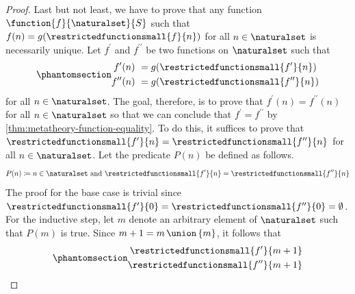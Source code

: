 \begin{proof}
    \vspace{0.3cm}
    \noindent
    Last but not least, we have to prove that any function \( \function{f}{\naturalset}{S} \) such that \( f(n) = g(\restrictedfunctionsmall{f}{n}) \)
    for all \( n \in \naturalset \) is necessarily unique.
    Let \( f^{\prime} \) and \( f^{\prime\prime} \) be two functions on \( \naturalset \) such that
    \begin{equation}
        \phantomsection \label{eq:f-prime-and-f-prime-prime-at-n-equals-g-at-the-function-restricted-to-n}
        \begin{aligned}
            f^{\prime}(n) &\\
            f^{\prime\prime}(n)&
        \end{aligned}
        \begin{aligned}
            &\ = g( \restrictedfunctionsmall{f^{\prime}}{n} )\\
            &\ = g( \restrictedfunctionsmall{f^{\prime\prime}}{n} )
        \end{aligned}
    \end{equation}
    for all \( n \in \naturalset \).
    The goal, therefore, is to prove that \( f^{\prime}(n) = f^{\prime\prime}(n) \) for all \( n \in \naturalset \)
    so that we can conclude that \( f^{\prime} = f^{\prime\prime} \) by \cref{thm:metatheory-function-equality}.
    To do this, it suffices to prove that \( \restrictedfunctionsmall{f^{\prime}}{n} = \restrictedfunctionsmall{f^{\prime\prime}}{n} \)
    for all \( n \in \naturalset \).
    Let the predicate \( P(n) \) be defined as follows.
    \begin{equation*}
        P(n) \coloneq n \in \naturalset \ \text{and} \ \restrictedfunctionsmall{f^{\prime}}{n} = \restrictedfunctionsmall{f^{\prime\prime}}{n}
    \end{equation*}
    The proof for the base case is trivial since \( \restrictedfunctionsmall{f^{\prime}}{0} = \restrictedfunctionsmall{f^{\prime\prime}}{0} = \emptyset \).
    For the inductive step, let \( m \) denote an arbitrary element of \( \naturalset \) such that \( P(m) \) is true.
    Since \( m + 1 = m \,{\union}\, \mleft\{ m \mright\} \), it follows that
    \begin{equation}
        \phantomsection \label{eq:f-prime-and-f-prime-prime-restricted-to-m-plus-one-union-form}
        \begin{aligned}
            \restrictedfunctionsmall{f^{\prime}}{m + 1} &\\
            \restrictedfunctionsmall{f^{\prime\prime}}{m + 1} &

\end{aligned}
\end{equation}
\end{proof}
